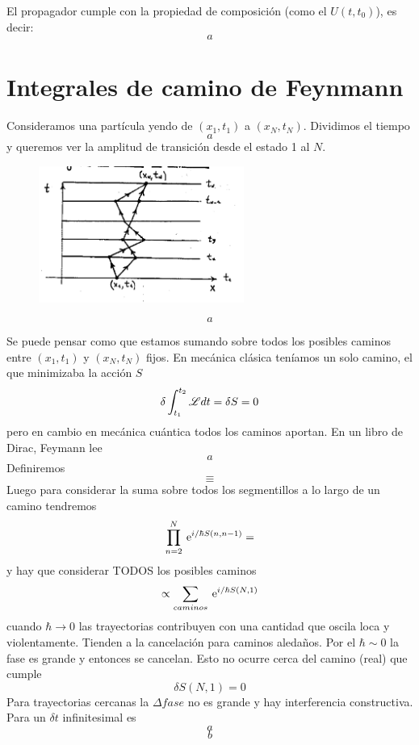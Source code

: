 \documentclass[10pt,oneside]{CBFT_book}
\begin{document}
El propagador cumple con la propiedad de composición (como el $U(t,t_0)$), es decir:
\[
	a
\]

\section{Integrales de camino de Feynmann}

Consideramos una partícula yendo de $(x_1,t_1)$ a $(x_N,t_N)$. Dividimos el tiempo 
\[
	a
\]
y queremos ver la amplitud de transición desde el estado 1 al $N$.

\begin{figure}[htb]
	\begin{center}
	\includegraphics[width=0.6\textwidth]{images/teo2_8.pdf}	 
	\end{center}
	\caption{}
\end{figure} 

\[
	a
\]

Se puede pensar como que estamos sumando sobre todos los posibles caminos entre $(x_1,t_1)$ y $(x_N,t_N)$ 
fijos. En mecánica clásica teníamos un solo camino, el que minimizaba la acción $S$
\[
	\delta \int_{t_1}^{t_2} \mathscr{L} dt = \delta S = 0
\]
pero en cambio en mecánica cuántica todos los caminos aportan. En un libro de Dirac, Feymann lee 
\[
	a
\]
Definiremos
\[
	\equiv 
\]
Luego para considerar la suma sobre todos los segmentillos a lo largo de un camino tendremos
\[
	\prod_{n=2}^N \:\mathrm{e}^{i/\hbar S(n,n-1)} =
\]
y hay que considerar TODOS los posibles caminos 
\[
	\propto \sum_{caminos} \:\mathrm{e}^{i/\hbar S(N,1)} 
\]
cuando $\hbar \to 0$ las trayectorias contribuyen con una cantidad que oscila loca y violentamente. Tienden a 
la cancelación para caminos aledaños. Por el $\hbar \sim 0$ la fase es grande y entonces se cancelan.
Esto no ocurre cerca del camino (real) que cumple 
\[
	\delta S(N,1) = 0
\]
Para trayectorias cercanas la $\Delta fase$ no es grande y hay interferencia constructiva.
Para un $\delta t$ infinitesimal es 
\[
	a
\]
\[
	b
\]
\end{document}
